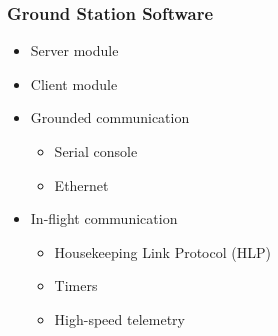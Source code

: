 \documentclass[landscape,xcolor={table}]{beamer}
\begin{document}
	\begin{frame}
		
		\frametitle{Ground Station Software}
		
		\noindent
		\begin{minipage}[t]{.5\textwidth}
		  
		  \begin{itemize}
		  	\item{Server module}
		  	\item{Client module}
		  	\item{Grounded communication}
		  	\begin{itemize}
		  		\item{Serial console}
		  		\item{Ethernet}
		  	\end{itemize}
		  	\item{In-flight communication}
			\begin{itemize}
		  		\item{Housekeeping Link Protocol (HLP)}
		  		\item{Timers}
		  		\item{High-speed telemetry}
		  	\end{itemize}
		  \end{itemize}
		\end{minipage}
		
		\begin{minipage}[t]{.44\textwidth}
		  

\end{minipage}
\end{frame}
\end{document}
